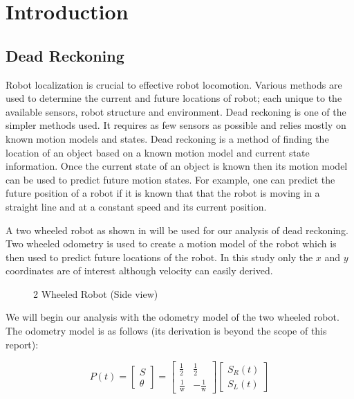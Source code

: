 \documentclass[main.tex]{subfiles}
\begin{document}
\section{Introduction}

\subsection{Dead Reckoning}\label{sec:deadReckon}


Robot localization is crucial to effective robot locomotion. Various methods are
used to determine the current and future locations of robot; each unique to the
available sensors, robot structure and environment. Dead reckoning is one of the
simpler methods used. It requires as few sensors as possible and relies mostly
on known motion models and states.  Dead reckoning is a method of finding the
location of an object based on a known motion model and current state
information. Once the current state of an object is known then its motion model
can be used to predict future motion states. For example, one can predict the
future position of a robot if it is known that that the robot is moving in a
straight line and at a constant speed and its current position.

A two wheeled robot as shown in  will be used for our analysis
of dead reckoning. Two wheeled odometry is used to create a motion model of the
robot which is then used to predict future locations of the robot. In this study
only the $x$ and $y$ coordinates are of interest although velocity can easily
derived. 

\begin{figure}[H]
\begin{center}

\end{center}
\caption{2 Wheeled Robot (Side view)}
\label{fig:2wheelBot}
\end{figure}

We will begin our analysis with the odometry model of the two wheeled robot. The
odometry model is as follows (its derivation is beyond the scope of this
report):

\begin{equation}
\label{eq:deadReckonState}
	P(t) = 
	\begin{bmatrix}
	S \\ \theta
	\end{bmatrix}
	=
	\begin{bmatrix}
	\frac{1}{2}	& \frac{1}{2} \\[0.3em]
	\frac{1}{\mathrm{w}} & -\frac{1}{\mathrm{w}}
	\end{bmatrix} 
	\begin{bmatrix}
	S_R(t) \\ S_L(t)
	\end{bmatrix}
\end{equation}
\end{document}
